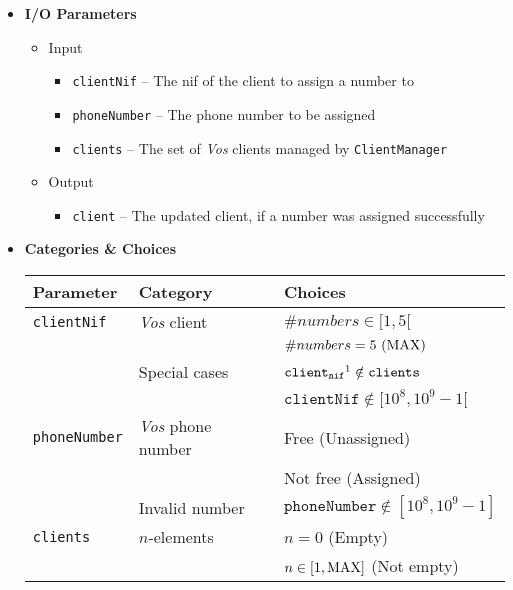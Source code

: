 \begin{itemize}
  \item \textbf{I/O Parameters}
  \begin{itemize}
    \normalsize
    \item Input
    \begin{itemize}
      \small
      \item \texttt{clientNif} -- The nif of the client to assign a number to
      \item \texttt{phoneNumber} -- The phone number to be assigned
      \item \texttt{clients} -- The set of \textit{Vos} clients managed by
            \texttt{ClientManager}
    \end{itemize}
    \item Output
    \begin{itemize}
      \normalsize
      \item \texttt{client} -- The updated client, if a number was assigned
            successfully
    \end{itemize}
  \end{itemize}
  \clearpage

  \item \textbf{Categories \& Choices}
  \begin{table}[!hbtp]
    \centering
    \normalsize
    \begin{tabular}{|l|l|l|}
      \hline
      \textbf{Parameter} & \textbf{Category} & \textbf{Choices} \\ \hline
      \texttt{clientNif}
      & \textit{Vos} client
        & $\#numbers \in [1,5[$     \\ \cline{3-3}
      & & $\#numbers = 5\ (\rm{MAX})$ \\ \cline{2-3}
      & Special cases
        & $\texttt{client}_{\texttt{nif}}\footnotemark
           \notin \texttt{clients}$ \\ \cline{3-3}
      & & $\texttt{clientNif} \notin [10^8,10^9-1[$ \\ \hline
      \texttt{phoneNumber}
      & \textit{Vos} phone number
        & Free (Unassigned)   \\ \cline{3-3}
      & & Not free (Assigned) \\ \cline{2-3}
      & Invalid number
        & $\texttt{phoneNumber} \notin [10^8,10^9-1]$ \\ \hline
      \texttt{clients}
      & $n$-elements
        & $n = 0$ (Empty)                  \\ \cline{3-3}
      & & $n \in [1,\rm{MAX}]$ (Not empty) \\ \hline
    \end{tabular}
  \end{table}


\end{itemize}

